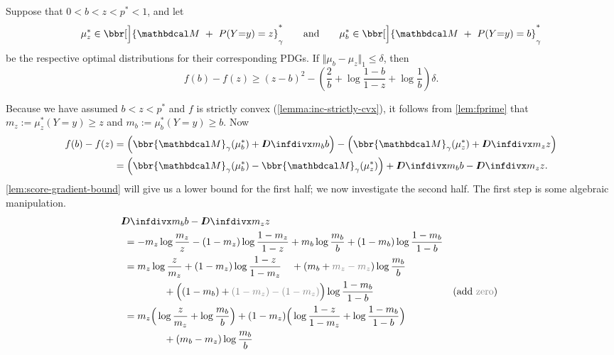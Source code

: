 \begin{lemma}\label{lem:D-lowerbound}
    Suppose that $0 < b < z < p^* < 1$,
    and let
    \[
        \mu_z^* \in \bbr[\Big]{\dg M ~+~ \Pr(Y{=}y )=z}^*_\gamma
        \qquad\text{and}\qquad
        \mu_b^* \in \bbr[\Big]{\dg M ~+~ \Pr(Y{=}y )=b}^*_\gamma
    \]
    be the respective optimal distributions for their corresponding PDGs.
    If $\Vert \mu_b - \mu_z \Vert_1 \le \delta$, then
    \[
        f(b) - f(z) \ge (z-b)^2 - \left( \frac2b   + \log \frac{1-b}{1-z} + \log \frac1b \right) \delta.
    \]
\end{lemma}
\begin{lproof}

    Because we have assumed $b < z < p^*$ and $f$ is strictly convex (\cref{lemma:inc-strictly-cvx}),  it follows from \cref{lem:fprime} that
        $m_z := \mu^*_z(Y{=}y) \ge z$ and
        $m_b := \mu^*_b(Y{=}y) \ge b$.
    Now
    \begin{align*}
        f(b) - f(z) &=
        \Big( \bbr{\dg M}_\gamma(\mu_b^*) +  \kldiv{ m_b }{b} \Big)
        -\Big( \bbr{\dg M}_\gamma(\mu_z^*) + \kldiv{ m_z }{z} \Big) \\
        &= \Big( \bbr{\dg M}_\gamma(\mu_b^*) - \bbr{\dg M}_\gamma(\mu_z^*) \Big)
         + \kldiv{m_b}{b} - \kldiv{m_z}{z}.
    \end{align*}
    \cref{lem:score-gradient-bound} will give us a lower bound for the first half;
    we now investigate the second half.
    The first step is some algebraic manipulation.
\def\squa#1{{\color{err#1}\blacksquare_{#1}}}
\begin{align*}
&\!\! \kldiv{m_b}{b} - \kldiv{m_z}z \\
&=
    -  m_z \log \frac{m_z}{z} - (1-m_z) \log \frac{1-m_z}{1-z}
    +  m_b \log \frac{m_b}{b} + (1-m_b) \log \frac{1-m_b}{1-b}
\\ &=
    m_z \log \frac{z}{m_z} + (1-m_z) \log \frac{1-z}{1-m_z}
    \quad+( m_b + {\color{zero}m_z - m_z} ) \log \frac{m_b}b
    \\&\qquad\qquad
     + \Big( (1-m_b) +{\color{zero}(1-m_z) - (1-m_z)} \Big)\log\frac{1-m_b}{1-b}
     &\text{(add {\color{zero}zero})}
 \\ &=
     m_z \Big( \log \frac{z}{m_z} + \log \frac{m_b}{b} \Big) +
     (1-m_z) \Big( \log \frac{1-z}{1-m_z} + \log \frac{1-m_b}{1-b} \Big)
        \\&\qquad\qquad
     + (m_b - m_z) \log \frac{m_b}{b}

\end{align*}
\end{lproof}
